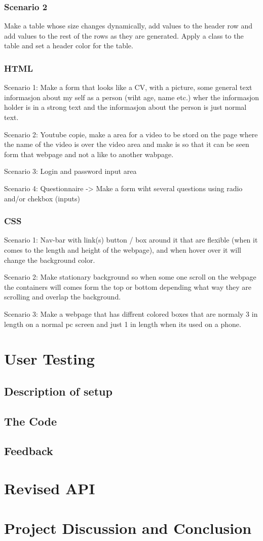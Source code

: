 \documentclass[12pt]{article}
\begin{document}
\subsubsection{Scenario 2}
Make a table whose size changes dynamically, add values to the header row and add values to the rest of the rows as they are generated. Apply a class to the table and set a header color for the table.

    \subsubsection{HTML}

    Scenario 1: Make a form that looks like a CV, with a picture, some general text informasjon about my self as a person (wiht age, name etc.) wher the informasjon holder is in a strong text and the informasjon about the person is just normal text.

    Scenario 2: Youtube copie, make a area for a video to be stord on the page where the name of the video is over the video area and make is so that it can be seen form that webpage and not a like to another wabpage.

    Scenario 3: Login and password input area

    Scenario 4: Questionnaire -> Make a form wiht several questions using radio and/or chekbox (inputs)

    \subsubsection{CSS}

    Scenario 1: Nav-bar with link(s) button / box around it that are flexible (when it comes to the length and height of the webpage), and when hover over it will change the background color.
        
    Scenario 2: Make stationary background so when some one scroll on the webpage the containers will comes form the top or bottom depending what way they are scrolling and overlap the background.

    Scenario 3: Make a webpage that has diffrent colored boxes that are normaly 3 in length on a normal pc screen and just 1 in length when its used on a phone.

\section{User Testing}

\subsection{Description of setup}

\subsection{The Code}

\subsection{Feedback}

\section{Revised API}

\section{Project Discussion and Conclusion}
\end{document}
